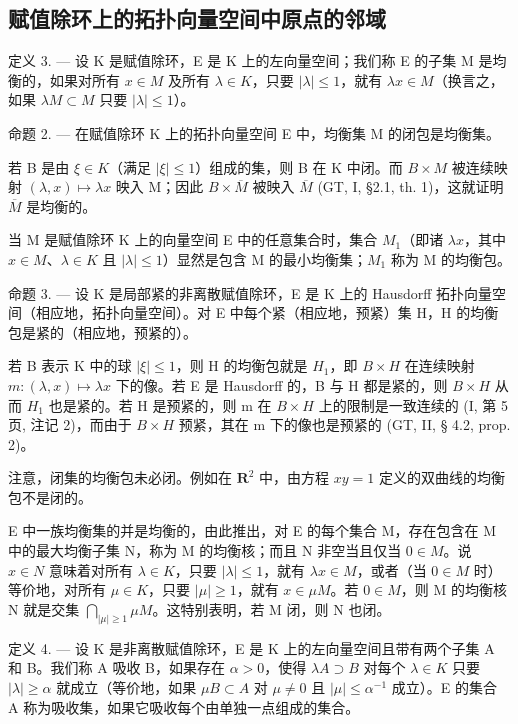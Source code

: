 \subsection{赋值除环上的拓扑向量空间中原点的邻域}

定义 3. --- 设 K 是赋值除环，E 是 K 上的左向量空间；我们称 E 的子集 M 是均衡的，如果对所有 \(x \in M\) 及所有 \(\lambda \in K\)，只要 \(|\lambda| \leqslant 1\)，就有 \(\lambda x \in M\)（换言之，如果 \(\lambda M \subset M\) 只要 \(|\lambda| \leqslant 1\)）。

命题 2. --- 在赋值除环 K 上的拓扑向量空间 E 中，均衡集 M 的闭包是均衡集。

若 B 是由 \(\xi\in K\)（满足 \(|\xi|\leqslant1\)）组成的集，则 B 在 K 中闭。而 \(B\times M\) 被连续映射 \((\lambda,x)\mapsto\lambda x\) 映入 M；因此 \(B\times\overline{M}\) 被映入 \(\overline{M}\) (GT, I, §2.1, th. 1)，这就证明 \(\overline{M}\) 是均衡的。

当 M 是赋值除环 K 上的向量空间 E 中的任意集合时，集合 \(M_{1}\)（即诸 \(\lambda x\)，其中 \(x \in M\)、\(\lambda \in K\) 且 \(|\lambda| \leqslant 1\)）显然是包含 M 的最小均衡集；\(M_{1}\) 称为 M 的均衡包。

命题 3. --- 设 K 是局部紧的非离散赋值除环，E 是 K 上的 Hausdorff 拓扑向量空间（相应地，拓扑向量空间）。对 E 中每个紧（相应地，预紧）集 H，H 的均衡包是紧的（相应地，预紧的）。

若 B 表示 K 中的球 \(|\xi| \leqslant 1\)，则 H 的均衡包就是 \(H_{1}\)，即 \(B \times H\) 在连续映射 \(m: (\lambda, x) \mapsto \lambda x\) 下的像。若 E 是 Hausdorff 的，B 与 H 都是紧的，则 \(B \times H\) 从而 \(H_{1}\) 也是紧的。若 H 是预紧的，则 m 在 \(B \times H\) 上的限制是一致连续的 (I, 第 5 页, 注记 2)，而由于 \(B \times H\) 预紧，其在 m 下的像也是预紧的 (GT, II, § 4.2, prop. 2)。

注意，闭集的均衡包未必闭。例如在 \(\mathbf{R}^2\) 中，由方程 \(xy = 1\) 定义的双曲线的均衡包不是闭的。

E 中一族均衡集的并是均衡的，由此推出，对 E 的每个集合 M，存在包含在 M 中的最大均衡子集 N，称为 M 的均衡核；而且 N 非空当且仅当 \(0 \in M\)。说 \(x \in N\) 意味着对所有 \(\lambda \in K\)，只要 \(|\lambda| \leqslant 1\)，就有 \(\lambda x \in M\)，或者（当 \(0 \in M\) 时）等价地，对所有 \(\mu \in K\)，只要 \(|\mu| \geqslant 1\)，就有 \(x \in \mu M\)。若 \(0 \in M\)，则 M 的均衡核 N 就是交集 \(\bigcap_{|\mu| \geqslant 1} \mu M\)。这特别表明，若 M 闭，则 N 也闭。

定义 4. --- 设 K 是非离散赋值除环，E 是 K 上的左向量空间且带有两个子集 A 和 B。我们称 A 吸收 B，如果存在 \(\alpha > 0\)，使得 \(\lambda A \supset B\) 对每个 \(\lambda \in K\) 只要 \(|\lambda| \geqslant \alpha\) 就成立（等价地，如果 \(\mu B \subset A\) 对 \(\mu \neq 0\) 且 \(|\mu| \leqslant \alpha^{-1}\) 成立）。E 的集合 A 称为吸收集，如果它吸收每个由单独一点组成的集合。

